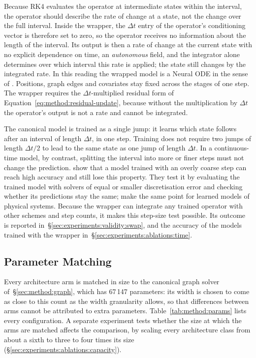 Because RK4 evaluates the operator at intermediate states within the
interval, the operator should describe the rate of change at a state, not
the change over the full interval. Inside the wrapper, the $\Delta t$ entry
of the operator's conditioning vector is therefore set to zero, so the
operator receives no information about the length of the interval. Its
output is then a rate of change at the current state with no explicit
dependence on time, an \emph{autonomous} field, and the integrator alone
determines over which interval this rate is applied; the state still
changes by the integrated rate. In this reading the wrapped model is a
Neural ODE in the sense of \citet{Chen2018}. Positions, graph edges and
covariates stay fixed across the stages of one step. The wrapper requires
the $\Delta t$-multiplied residual form of
Equation~\eqref{eq:method:residual-update}, because without the
multiplication by $\Delta t$ the operator's output is not a rate and cannot
be integrated.

The canonical model is trained as a single jump: it learns which state
follows after an interval of length $\Delta t$, in one step. Training does
not require two jumps of length $\Delta t / 2$ to lead to the same state as
one jump of length $\Delta t$. In a continuous-time model, by contrast,
splitting the interval into more or finer steps must not change the
prediction. \citet{Ott2021} show that a model trained with an overly coarse
step can reach high accuracy and still lose this property. They test it by
evaluating the trained model with solvers of equal or smaller
discretisation error and checking whether its predictions stay the same;
\citet{Krishnapriyan2023} make the same point for learned models of
physical systems. Because the wrapper can integrate any trained operator
with other schemes and step counts, it makes this step-size test
possible. Its outcome is reported in~\S\ref{sec:experiments:validity:swap},
and the accuracy of the models trained with the wrapper
in~\S\ref{sec:experiments:ablations:time}.

\subsection{Parameter Matching}
\label{sec:method:family:params}

Every architecture arm is matched in size to the canonical graph solver
of~\S\ref{sec:method:graph}, which has 67\,147 parameters: its width is
chosen to come as close to this count as the width granularity allows, so
that differences between arms cannot be attributed to extra parameters.
Table~\ref{tab:method:params} lists every configuration. A separate
experiment tests whether the size at which the arms are matched affects the
comparison, by scaling every architecture class from about a sixth to
three to four times its size (\S\ref{sec:experiments:ablations:capacity}).

